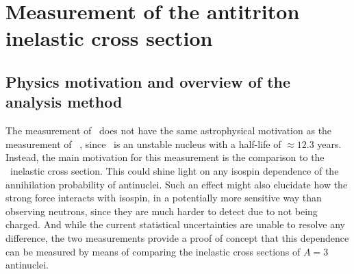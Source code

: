 \section{Measurement of the antitriton inelastic cross section}\label{sec:ResTritonSigmaInel}
\subsection{Physics motivation and overview of the analysis method}
The measurement of \sigmainelH\ does not have the same astrophysical motivation as the measurement of \sigmainel\ , since \atrit\ is an unstable nucleus with a half-life of $\approx 12.3$ years. Instead, the main motivation for this measurement is the comparison to the \ahe\ inelastic cross section. This could shine light on any isospin dependence of the annihilation probability of antinuclei. Such an effect might also elucidate how the strong force interacts with isospin, in a potentially more sensitive way than observing neutrons, since they are much harder to detect due to not being charged. And while the current statistical uncertainties are unable to resolve any difference, the two measurements provide a proof of concept that this dependence can be measured by means of comparing the inelastic cross sections of $A=3$ antinuclei.
